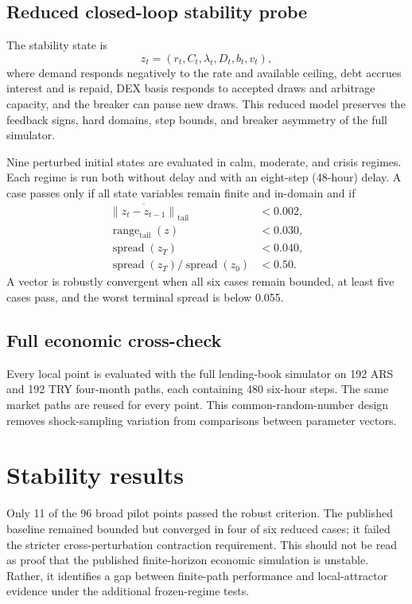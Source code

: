 \documentclass[11pt,a4paper]{article}
\begin{document}
\subsection{Reduced closed-loop stability probe}

The stability state is
\begin{equation}
z_t=(r_t,C_t,\lambda_t,D_t,b_t,v_t),
\end{equation}
where demand responds negatively to the rate and available ceiling, debt
accrues interest and is repaid, DEX basis responds to accepted draws and
arbitrage capacity, and the breaker can pause new draws. This reduced model
preserves the feedback signs, hard domains, step bounds, and breaker asymmetry of
the full simulator.

Nine perturbed initial states are evaluated in calm, moderate, and crisis
regimes. Each regime is run both without delay and with an eight-step (48-hour)
delay. A case passes only if all state variables remain finite and in-domain and
if
\begin{align}
\overline{\lVert z_t-z_{t-1}\rVert}_{\mathrm{tail}}&<0.002,\\
\operatorname{range}_{\mathrm{tail}}(z)&<0.030,\\
\operatorname{spread}(z_T)&<0.040,\\
\operatorname{spread}(z_T)/\operatorname{spread}(z_0)&<0.50.
\end{align}
A vector is robustly convergent when all six cases remain bounded, at least five
cases pass, and the worst terminal spread is below 0.055.

\subsection{Full economic cross-check}

Every local point is evaluated with the full lending-book simulator on 192 ARS
and 192 TRY four-month paths, each containing 480 six-hour steps. The same
market paths are reused for every point. This common-random-number design removes
shock-sampling variation from comparisons between parameter vectors.

\section{Stability results}

Only 11 of the 96 broad pilot points passed the robust criterion. The published
baseline remained bounded but converged in four of six reduced cases; it failed
the stricter cross-perturbation contraction requirement. This should not be read
as proof that the published finite-horizon economic simulation is unstable.
Rather, it identifies a gap between finite-path performance and local-attractor
evidence under the additional frozen-regime tests.
\end{document}
